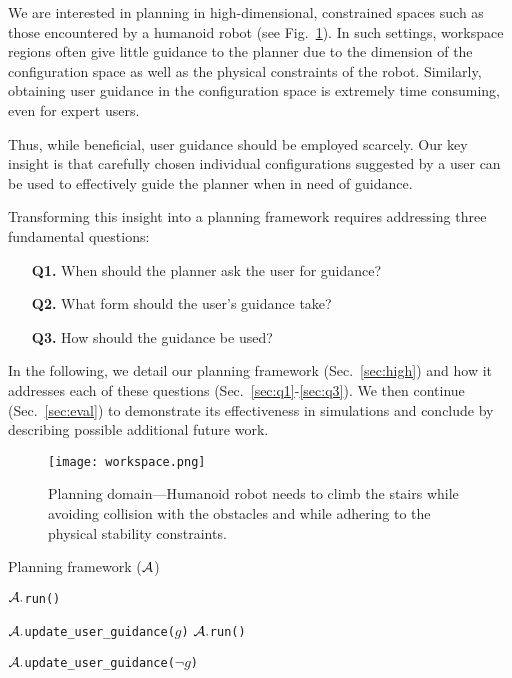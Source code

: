 \documentclass[conference]{IEEEtran}
\begin{document}
We are interested in planning in high-dimensional, constrained spaces such as those encountered by a humanoid robot (see Fig.~\ref{fig:robot}).
In such settings, workspace regions often give little guidance to the planner due to the dimension of the configuration space as well as the physical constraints of the robot.
Similarly, obtaining user guidance in the configuration space is extremely time consuming, even for expert users.


Thus,  while beneficial, user guidance should be employed scarcely.
Our key insight is that carefully chosen individual configurations suggested by a user can be used to effectively guide the planner when in need of guidance.


Transforming this insight into a planning framework requires addressing three fundamental questions:

\begin{itemize}
	\item[\textbf{Q1.}] When should the planner ask the user for guidance?
	\item[\textbf{Q2.}] What form should the user's guidance take?
	\item[\textbf{Q3.}] How should the guidance be used?
\end{itemize}
 
In the following, we detail our planning framework (Sec.~\ref{sec:high}) and how it addresses each of these questions (Sec.~\ref{sec:q1}-\ref{sec:q3}).
We then continue (Sec.~\ref{sec:eval}) to demonstrate its effectiveness in simulations and conclude by describing possible additional future work.

\begin{figure}[tb]
  \centering
  	\texttt{[image: workspace.png]}
  	\vspace{-2mm}
  \caption{
		Planning domain---Humanoid robot needs to climb the stairs while avoiding collision with the obstacles and while adhering to the physical stability constraints.
  	}
   	\label{fig:robot}
\end{figure}

\begin{algorithm}[tb]
\caption{Planning framework ($\mathcal{A}$)}
\label{alg:main}	
\begin{algorithmic}[1]
\small
{} 
		\State $\mathcal{A}.$\texttt{run()}
	\EndWhile
	
	\State $\mathcal{A}.$\texttt{update\_user\_guidance($g$)}
		\State $\mathcal{A}.$\texttt{run()}
	\EndWhile

	\State $\mathcal{A}.$\texttt{update\_user\_guidance($\neg g$)}
\EndWhile
\end{algorithmic}
\end{algorithm}
\end{document}
